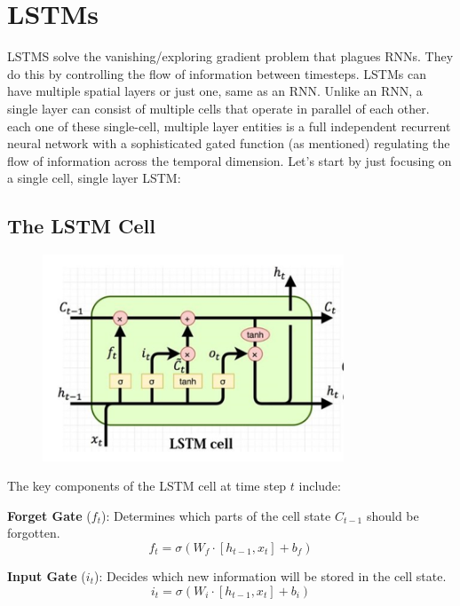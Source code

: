 \documentclass[12pt]{article}
\begin{document}
\section{LSTMs}
LSTMS solve the vanishing/exploring gradient problem that plagues RNNs. They do this by controlling the flow of information between timesteps. LSTMs can have multiple spatial layers or just one, same as an RNN. Unlike an RNN, a single layer can consist of multiple cells that operate in parallel of each other. each one of these single-cell, multiple layer entities is a full independent recurrent neural network with a sophisticated gated function (as mentioned) regulating the flow of information across the temporal dimension. Let's start by just focusing on a single cell, single layer LSTM:

\subsection{The LSTM Cell}

\begin{figure}[H]
    \centering
    \includegraphics[width=0.8\textwidth]{./lstm_cell.png} %
\end{figure}
The key components of the LSTM cell at time step \(t\) include:

\textbf{Forget Gate} (\(f_t\)): Determines which parts of the cell state \(C_{t-1}\) should be forgotten.
\begin{equation}
    f_t = \sigma(W_f \cdot [h_{t-1}, x_t] + b_f)
\end{equation}

\textbf{Input Gate} (\(i_t\)): Decides which new information will be stored in the cell state.
\begin{equation}
    i_t = \sigma(W_i \cdot [h_{t-1}, x_t] + b_i)
\end{equation}
\end{document}
